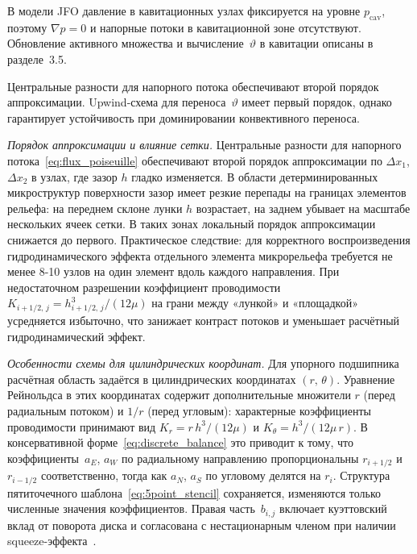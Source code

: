 В модели JFO давление в кавитационных узлах фиксируется на уровне $p_{\mathrm{cav}}$, поэтому $\nabla p = 0$ и напорные потоки в кавитационной зоне отсутствуют. Обновление активного множества и вычисление~$\vartheta$ в кавитации описаны в разделе~3.5.

Центральные разности для напорного потока обеспечивают второй порядок аппроксимации. Upwind-схема для переноса~$\vartheta$ имеет первый порядок, однако гарантирует устойчивость при доминировании конвективного переноса.

\textit{Порядок аппроксимации и влияние сетки.}
Центральные разности для напорного
потока~\eqref{eq:flux_poiseuille} обеспечивают второй порядок
аппроксимации по $\Delta x_1$, $\Delta x_2$ в узлах, где
зазор $h$ гладко изменяется. В области детерминированных
микроструктур поверхности зазор имеет резкие перепады
на границах элементов рельефа: на переднем склоне лунки $h$
возрастает, на заднем убывает на масштабе нескольких ячеек
сетки. В таких зонах локальный порядок аппроксимации снижается
до первого. Практическое следствие: для корректного
воспроизведения гидродинамического эффекта отдельного элемента
микрорельефа требуется не менее 8-10 узлов на один элемент
вдоль каждого направления. При недостаточном разрешении
коэффициент проводимости~$K_{i+1/2,\,j} =
h_{i+1/2,\,j}^3/(12\mu)$ на грани между «лункой»
и «площадкой» усредняется избыточно, что занижает контраст
потоков и уменьшает расчётный гидродинамический эффект.

\textit{Особенности схемы для цилиндрических координат.}
Для упорного подшипника расчётная область задаётся
в цилиндрических координатах $(r,\,\theta)$. Уравнение
Рейнольдса в этих координатах содержит дополнительные
множители $r$ (перед радиальным потоком) и $1/r$ (перед
угловым): характерные коэффициенты проводимости принимают вид
$K_{r} = r\,h^3/(12\mu)$ и $K_\theta = h^3/(12\mu\,r)$.
В консервативной форме~\eqref{eq:discrete_balance} это
приводит к тому, что коэффициенты~$a_E$, $a_W$ по радиальному
направлению пропорциональны $r_{i+1/2}$ и $r_{i-1/2}$
соответственно, тогда как $a_N$, $a_S$ по угловому делятся
на $r_i$. Структура пятиточечного
шаблона~\eqref{eq:5point_stencil} сохраняется, изменяются
только численные значения коэффициентов.
Правая часть~$b_{i,j}$ включает куэттовский вклад от поворота
диска и согласована с нестационарным членом при наличии
squeeze-эффекта~\cite{han2016,panday2012}.
